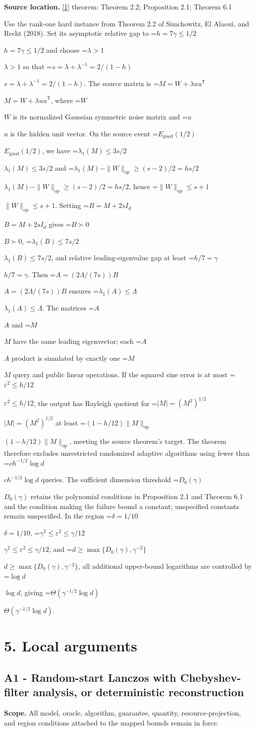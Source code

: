 \documentclass[10pt,a4paper]{article}
\newcommand{\AtlasMath}[1]{\par\begingroup\centering\setbox0=\hbox{$\displaystyle #1$}\ifdim\wd0>1.4\linewidth\typeout{ATLAS WIDE FORMULA: \the\wd0}\fi\ifdim\wd0>\linewidth\resizebox{\linewidth}{!}{\box0}\else\box0\fi\par\endgroup}
\newcommand{\AtlasInlineMath}[1]{\begingroup\setbox0=\hbox{$#1$}\ifdim\wd0>.4\linewidth\endgroup\AtlasMath{#1}\else\endgroup$#1$\fi}
\begin{document}
\textbf{Source location.} \href{https://arxiv.org/abs/1804.01221}{[1]} theorem: Theorem 2.2; Proposition 2.1; Theorem 6.1

Use the rank-one hard instance from Theorem 2.2 of Simchowitz, El Alaoui, and Recht (2018). Set its asymptotic relative gap to \AtlasInlineMath{h=7\gamma\le1/2} and choose \AtlasInlineMath{\lambda>1} so that \AtlasInlineMath{s=\lambda+\lambda^{-1}=2/(1-h)}. The source matrix is \AtlasInlineMath{M=W+\lambda uu^{\mathsf T}}, where \AtlasInlineMath{W} is its normalized Gaussian symmetric noise matrix and \AtlasInlineMath{u} is the hidden unit vector. On the source event \AtlasInlineMath{E_{\mathrm{good}}(1/2)}, we have \AtlasInlineMath{\lambda_1(M)\le3s/2} and \AtlasInlineMath{\lambda_1(M)-\|W\|_{\mathrm{op}}\ge(s-2)/2=hs/2}, hence \AtlasInlineMath{\|W\|_{\mathrm{op}}\le s+1}. Setting \AtlasInlineMath{B=M+2sI_d} gives \AtlasInlineMath{B\succ0}, \AtlasInlineMath{\lambda_1(B)\le7s/2}, and relative leading-eigenvalue gap at least \AtlasInlineMath{h/7=\gamma}. Then \AtlasInlineMath{A=(2\Lambda/(7s))B} ensures \AtlasInlineMath{\lambda_1(A)\le\Lambda}. The matrices \AtlasInlineMath{A} and \AtlasInlineMath{M} have the same leading eigenvector; each \AtlasInlineMath{A} product is simulated by exactly one \AtlasInlineMath{M} query and public linear operations. If the squared sine error is at most \AtlasInlineMath{\varepsilon^2\le h/12}, the output has Rayleigh quotient for \AtlasInlineMath{|M|=(M^2)^{1/2}} at least \AtlasInlineMath{(1-h/12)\|M\|_{\mathrm{op}}}, meeting the source theorem's target. The theorem therefore excludes unrestricted randomized adaptive algorithms using fewer than \AtlasInlineMath{ch^{-1/2}\log d} queries. The sufficient dimension threshold \AtlasInlineMath{D_0(\gamma)} retains the polynomial conditions in Proposition 2.1 and Theorem 6.1 and the condition making the failure bound a constant; unspecified constants remain unspecified. In the region \AtlasInlineMath{\delta=1/10}, \AtlasInlineMath{\gamma^2\le\varepsilon^2\le\gamma/12}, and \AtlasInlineMath{d\ge\max\{D_0(\gamma),\gamma^{-2}\}}, all additional upper-bound logarithms are controlled by \AtlasInlineMath{\log d}, giving \AtlasInlineMath{\Theta(\gamma^{-1/2}\log d)}.

\section{5. Local arguments}
\subsection{A1 - Random-start Lanczos with Chebyshev-filter analysis, or deterministic reconstruction}
\textbf{Scope.} All model, oracle, algorithm, guarantee, quantity, resource-projection, and region conditions attached to the mapped bounds remain in force.
\end{document}
